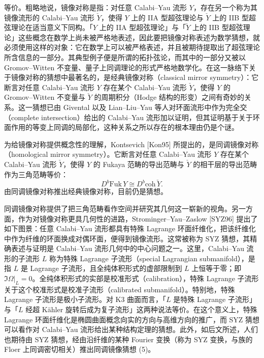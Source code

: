 等价。粗略地说，镜像对称是指：对任意 Calabi--Yau 流形 $Y$，存在另一个称为其镜像流形的 Calabi--Yau 流形 $\check Y$，使得 $Y$ 上的 IIA 型超弦理论与 $\check Y$ 上的 IIB 型超弦理论在适当意义下同构。「$Y$ 上的 IIA 型超弦理论」与「$\check Y$ 上的 IIB 型超弦理论」这些概念在数学上尚未被严格地表述，因此要把镜像对称表述为数学猜想，就必须使用这样的对象：它在数学上可以被严格表述，并且被期待提取出了超弦理论所含信息的一部分。其典型例子便是所谓的拓扑弦论，而其中的一部分又被以 Gromov--Witten 不变量、量子上同调理论的形式严格地数学化。在这一脉络下关于镜像对称的猜想中最著名的，是经典镜像对称（classical mirror symmetry）：它断言对任意 Calabi--Yau 流形 $Y$ 存在某个 Calabi--Yau 流形 $\check Y$，使得 $Y$ 的 Gromov--Witten 不变量与 $\check Y$ 的周期积分（Hodge 结构的形变）之间有奇妙的关系。这一猜想已由 Givental 以及 Lian--Liu--Yau 等人对环面流形中作为完全交（complete intersection）给出的 Calabi--Yau 流形加以证明，但其证明基于关于环面作用的等变上同调的局部化，这种关系之所以存在的根本理由仍是个谜。

为给镜像对称提供概念性的理解，Kontsevich [Kon95] 所提出的，是同调镜像对称（homological mirror symmetry）。它断言对任意 Calabi--Yau 流形 $Y$ 存在某个 Calabi--Yau 流形 $\check Y$，使得 $Y$ 的 Fukaya 范畴的导出范畴与 $\check Y$ 的相干层的导出范畴作为三角范畴等价：
\begin{equation}
D^b\mathrm{Fuk}\,Y\cong D^b\mathrm{coh}\,\check Y.
\tag{5}
\end{equation}
由同调镜像对称推出经典镜像对称，目前仍是猜想。

同调镜像对称提供了把三角范畴看作空间并研究其几何这一崭新的视角。另一方面，作为对镜像对称更具几何性的进路，Strominger--Yau--Zaslow [SYZ96] 提出了如下图景：任意 Calabi--Yau 流形都具有特殊 Lagrange 环面纤维化，把该纤维化中作为纤维的环面换成对偶环面，便得到镜像流形。这常被称为 SYZ 猜想，其精确表述与证明是 Calabi--Yau 流形几何中的中心问题之一。这里，Calabi--Yau 流形的子流形 $L$ 称为特殊 Lagrange 子流形（special Lagrangian submanifold），是指 $L$ 是 Lagrange 子流形，且全纯体积形式的虚部限制到 $L$ 上恒等于零；即 $\Im\Omega|_L=0$。全纯体积形式的实部是校准形式（calibration），特殊 Lagrange 子流形关于这个校准形式是校准子流形（calibrated submanifold）。特别地，特殊 Lagrange 子流形是极小子流形。对 K3 曲面而言，「$L$ 是特殊 Lagrange 子流形」与「$L$ 经超 K\"ahler 旋转后成为复子流形」这两种说法等价。在这个意义上，特殊 Lagrange 环面纤维化是椭圆曲面概念向实的方向与高维方向的推广，而 SYZ 猜想可以看作对 Calabi--Yau 流形给出某种结构定理的猜想。此外，如后文所述，人们也期待由 SYZ 猜想，经由沿纤维的某种 Fourier 变换（称为 SYZ 变换，与族的 Floer 上同调密切相关）推出同调镜像猜想 (5)。

